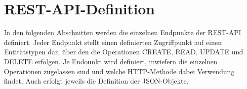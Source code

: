 \chapter{REST-API-Definition}
\label{sec:RESTAPIDefinition}

In den folgenden Abschnitten werden die einzelnen Endpunkte der REST-API definiert.
Jeder Endpunkt stellt einen definierten Zugriffpunkt auf einen Entitätstypen dar, über den die Operationen CREATE, READ, UPDATE und DELETE erfolgen.
Je Endounkt wird definiert, inwiefern die einzelnen Operationen zugelassen sind und welche HTTP-Methode dabei Verwendung findet.
Auch erfolgt jeweils die Definition der JSON-Objekte.






